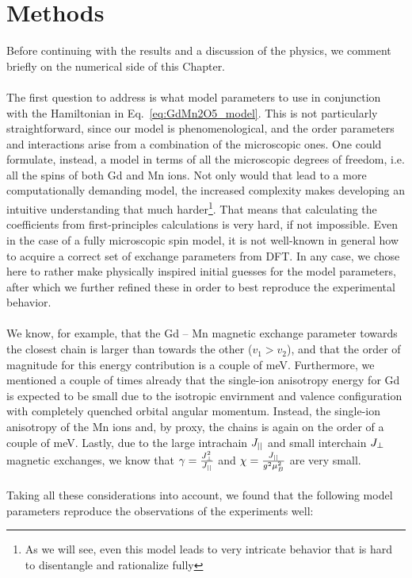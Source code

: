 \section{Methods \label{sec:GdMn2O5_methods}}
Before continuing with the results and a discussion of the physics, we comment briefly on the numerical side of this Chapter.\\\\
The first question to address is what model parameters to use in conjunction with the Hamiltonian in Eq.~\eqref{eq:GdMn2O5_model}.
This is not particularly straightforward, since our model is phenomenological, and the order parameters and interactions arise from a combination of the microscopic ones.
One could formulate, instead, a model in terms of all the microscopic degrees of freedom, i.e. all the spins of both Gd and Mn ions.
Not only would that lead to a more computationally demanding model, the increased complexity makes developing an intuitive understanding that much harder\footnote{As we will see, even this model leads to very intricate behavior that is hard to disentangle and rationalize fully}.
That means that calculating the coefficients from first-principles calculations is very hard, if not impossible. Even in the case of a fully microscopic spin model, it is not well-known in general how to acquire a correct set of exchange parameters from DFT.
In any case, we chose here to rather make physically inspired initial guesses for the model parameters, after which we further refined these in order to best reproduce the experimental behavior.
\\\\
We know, for example, that the Gd -- Mn magnetic exchange parameter towards the closest chain is larger than towards the other ($v_1>v_2$), and that the order of magnitude for this energy contribution is a couple of meV.
Furthermore, we mentioned a couple of times already that the single-ion anisotropy energy for Gd is expected to be small due to the isotropic envirnment and valence configuration with completely quenched orbital angular momentum.
Instead, the single-ion anisotropy of the Mn ions and, by proxy, the chains is again on the order of a couple of meV.
Lastly, due to the large intrachain $J_{||}$ and small interchain $J_{\perp}$ magnetic exchanges, we know that $\gamma = \frac{J_{\perp}^2}{J_{||}}$ and $\chi = \frac{J_{||}}{g^2\mu_B^2}$ are very small.
\\\\
Taking all these considerations into account, we found that the following model parameters reproduce the observations of the experiments well:  
